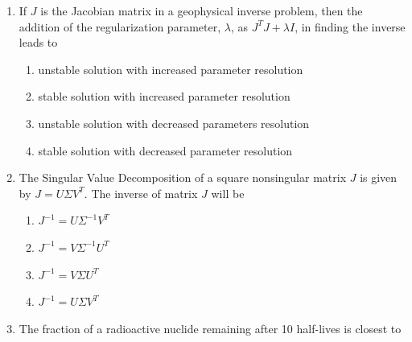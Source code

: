 \documentclass[journal,12pt,onecolumn]{IEEEtran}
\begin{document}
\begin{enumerate}
\begin{enumerate}
\hfill{}

\begin{multicols}{4}
\begin{enumerate}[label=(\Alph*)]
\item $\displaystyle \Phi(r)=\dfrac{A}{r^2}$
\item $\displaystyle \Phi(r)=A+\dfrac{B}{r}$
\item $\displaystyle \Phi(r)=A\ln r+B$
\item $\displaystyle \Phi(r)=Ar+\dfrac{B}{r}$
\end{enumerate}
\end{multicols}

\item If $J$ is the Jacobian matrix in a geophysical inverse problem, then the addition of the regularization parameter, $\lambda$, as $J^TJ + \lambda I$, in finding the inverse leads to

\hfill{}


\begin{enumerate}[label=(\Alph*)]
\item unstable solution with increased parameter resolution
\item stable solution with increased parameter resolution
\item unstable solution with decreased parameters resolution
\item stable solution with decreased parameter resolution
\end{enumerate}


\item The Singular Value Decomposition of a square nonsingular matrix $J$ is given by $J=U\Sigma V^{T}$. The inverse of matrix $J$ will be

\hfill{}

\begin{multicols}{1}
\begin{enumerate}[label=(\Alph*)]
\item $J^{-1}=U\Sigma^{-1}V^{T}$
\item $J^{-1}=V\Sigma^{-1}U^{T}$
\item $J^{-1}=V\Sigma U^{T}$
\item $J^{-1}=U\Sigma V^{T}$
\end{enumerate}
\end{multicols}

\item The fraction of a radioactive nuclide remaining after 10 half-lives is closest to


\end{enumerate}
\end{enumerate}
\end{document}
